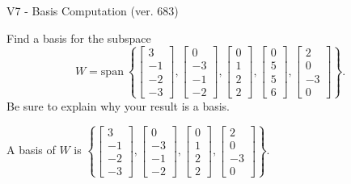 \begin{exercise}
  \begin{exerciseTitle}V7 - Basis Computation (ver. 683)\end{exerciseTitle}
  \begin{exerciseStatement}
    Find a basis for the subspace 
\[W=\mathrm{span}\ \left\{\left[\begin{array}{r}
3 \\
-1 \\
-2 \\
-3
\end{array}\right] , \left[\begin{array}{r}
0 \\
-3 \\
-1 \\
-2
\end{array}\right] , \left[\begin{array}{r}
0 \\
1 \\
2 \\
2
\end{array}\right] , \left[\begin{array}{r}
0 \\
5 \\
5 \\
6
\end{array}\right] , \left[\begin{array}{r}
2 \\
0 \\
-3 \\
0
\end{array}\right]\right\}.\]
 Be sure to explain why your result is a basis.


  \end{exerciseStatement}
  \begin{exerciseAnswer}
   A basis of \(W\) is  \(\left\{\left[\begin{array}{r}
3 \\
-1 \\
-2 \\
-3
\end{array}\right] , \left[\begin{array}{r}
0 \\
-3 \\
-1 \\
-2
\end{array}\right] , \left[\begin{array}{r}
0 \\
1 \\
2 \\
2
\end{array}\right] , \left[\begin{array}{r}
2 \\
0 \\
-3 \\
0
\end{array}\right]\right\}\).
  


  \end{exerciseAnswer}
\end{exercise}